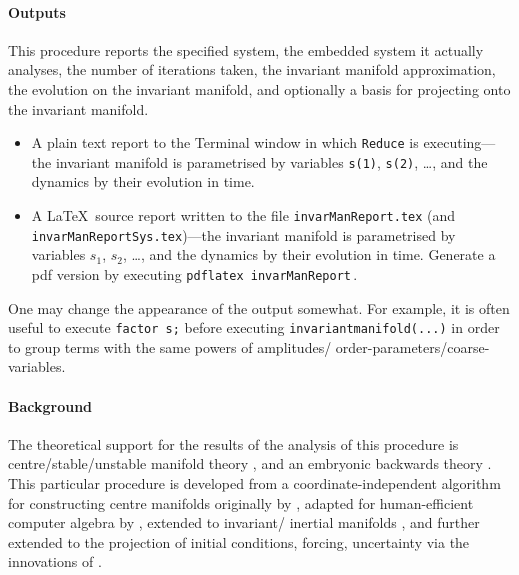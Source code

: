 \documentclass[11pt,a5paper]{article}
\begin{document}
\paragraph{Outputs}  This procedure reports the specified
system, the embedded system it actually analyses, the number
of iterations taken, the invariant manifold approximation,
the evolution on the invariant manifold, and optionally a
basis for projecting onto the invariant manifold.
\begin{itemize}
\item A plain text report to the Terminal window in which
\verb|Reduce| is executing---the invariant manifold is
parametrised by variables \verb|s(1)|, \verb|s(2)|, \ldots,
and the dynamics by their evolution in time.
\item A \LaTeX\ source report written to the file
\verb|invarManReport.tex| (and
\verb|invarManReportSys.tex|)---the invariant manifold is
parametrised by variables \(s_1\), \(s_2\), \ldots, and the
dynamics by their evolution in time.  Generate a pdf version
by executing \verb|pdflatex invarManReport|\,.
\end{itemize}
One may change the appearance of the output somewhat. For
example, it is often useful to execute  \verb|factor s;|
before executing \verb|invariantmanifold(...)| in order to
group terms with the same powers of amplitudes\slash
order-parameters\slash coarse-variables.


\paragraph{Background}
The theoretical support for the results of the analysis of
this procedure is centre\slash stable\slash unstable
manifold theory \cite[e.g.,][]{Carr81, Haragus2011,
Roberts2014a}, and an embryonic backwards theory
\cite[]{Roberts2018a}. This particular procedure is
developed from a coordinate-independent algorithm for
constructing centre manifolds originally by
\cite{Coullet83}, adapted for human-efficient computer
algebra by \cite{Roberts96a}, extended to invariant\slash
inertial manifolds \cite[]{Roberts89, Foias88b}, and further
extended to the projection of initial conditions, forcing,
uncertainty via the innovations of \cite{Roberts89b,
Roberts97b}.
\end{document}
